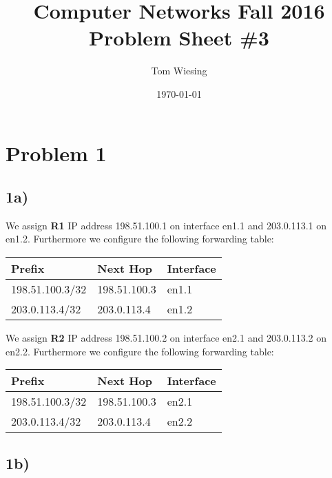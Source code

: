 \documentclass[a4paper,10pt]{article}
\title{Computer Networks Fall 2016\\Problem Sheet \#3}
\author{Tom Wiesing}
\date{\today}
\begin{document}
\maketitle

\section{Problem 1}
\subsection{1a)}
We assign \textbf{R1} IP address 198.51.100.1 on interface en1.1 and 203.0.113.1 on en1.2. Furthermore we configure the following forwarding table: \\

\begin{tabular}{ l | l | l}
  Prefix & Next Hop & Interface \\
  \hline
  198.51.100.3/32 & 198.51.100.3 & en1.1 \\
  203.0.113.4/32 & 203.0.113.4 & en1.2 \\
  \hline
\end{tabular}

We assign \textbf{R2} IP address 198.51.100.2 on interface en2.1 and 203.0.113.2 on en2.2. Furthermore we configure the following forwarding table:

\begin{tabular}{ l | l | l}
  Prefix & Next Hop & Interface \\
  \hline
  198.51.100.3/32 & 198.51.100.3 & en2.1 \\
  203.0.113.4/32 & 203.0.113.4 & en2.2 \\
  \hline
\end{tabular}

\subsection{1b)}
\end{document}
